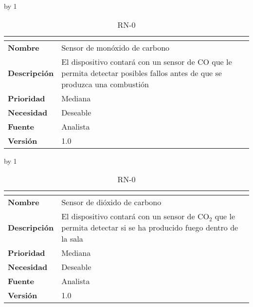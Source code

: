 \advance\rn by 1
\begin{table}[H]
	\caption{RN-0\number\rn}
	\begin{tabular}{|l|p{}|}
		\hline
		\multicolumn{2}{|c|}{\cellcolor[HTML]{BFBFBF}{\color[HTML]{000000} \textbf{RN-0\number\rn}}} \\ \hline
		\textbf{Nombre}      & Sensor de monóxido de carbono                                                                                              \\ \hline
		\textbf{Descripción} & El dispositivo contará con un sensor de CO que le permita detectar posibles fallos antes de que se produzca una combustión \\ \hline
		\textbf{Prioridad}   & Mediana                                                                                                                    \\ \hline
		\textbf{Necesidad}   & Deseable                                                                                                                   \\ \hline
		\textbf{Fuente}      & Analista                                                                                                                   \\ \hline
		\textbf{Versión}     & 1.0                                                                                                                        \\ \hline
	\end{tabular}
\end{table}
\advance\rn by 1
\begin{table}[H]
	\caption{RN-0\number\rn}
	\begin{tabular}{|l|p{}|}
		\hline
		\multicolumn{2}{|c|}{\cellcolor[HTML]{BFBFBF}{\color[HTML]{000000} \textbf{RN-0\number\rn}}} \\ \hline
		\textbf{Nombre}      & Sensor de dióxido de carbono                                                                                      \\ \hline
		\textbf{Descripción} & El dispositivo contará con un sensor de CO$_2$ que le permita detectar si se ha producido fuego dentro de la sala \\ \hline
		\textbf{Prioridad}   & Mediana                                                                                                           \\ \hline
		\textbf{Necesidad}   & Deseable                                                                                                          \\ \hline
		\textbf{Fuente}      & Analista                                                                                                          \\ \hline
		\textbf{Versión}     & 1.0                                                                                                               \\ \hline
	\end{tabular}
\end{table}
